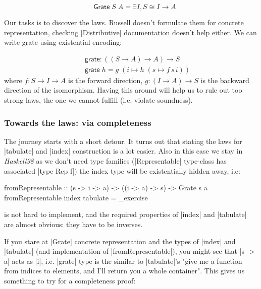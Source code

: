 \documentclass{article}
\begin{document}
\begin{equation}
\quad \mathsf{Grate}\;S\;A = \exists I, S \cong I \to A
\end{equation}

Our tasks is to discover the laws. Russell doesn't formulate them for
concrete representation, checking
\href{http://hackage.haskell.org/package/distributive-0.6/docs/Data-Distributive.html}{|Distributive| documentation}
doesn't help either. We can write grate using existential encoding:

\begin{equation}
\begin{aligned}
  \quad & \mathsf{grate} : ((S \to A) \to A) \to S \\
        & \mathsf{grate}\; h = g\; (i \mapsto h\; (s \mapsto f\, s\, i))
\end{aligned}
\end{equation}
where $f : S \to I \to A$ is the forward direction,
$g : (I \to A) \to S $ is the backward direction of the isomorphism.
Having this around will help us to rule out too strong laws, the one
we cannot fulfill (i.e. violate soundness).

\subsubsection{Towards the laws: via completeness}

The journey starts with a short detour. It turns out that stating the laws
for |tabulate| and |index| construction is a lot easier.
Also in this case we stay in \emph{Haskell98} as we don't need type families
(|Representable| type-class has associated |type Rep f|)
the index type will be existentially hidden away, i.e:

\begin{code}
fromRepresentable :: (s -> i -> a) -> ((i -> a) -> s) -> Grate s a
fromRepresentable index tabulate = _exercise
\end{code}

is not hard to implement, and the required properties of |index| and |tabulate|
are almost obvious: they have to be inverses.

If you stare at |Grate| concrete representation and the types of |index| and
|tabulate| (and implementation of |fromRepresentable|), you might see
that |s -> a| acts as |i|, i.e. |grate| type is the similar to |tabulate|'s
"give me a function from indices to elements, and I'll return you a whole container".
This gives us something to try for a completeness proof:
\end{document}
